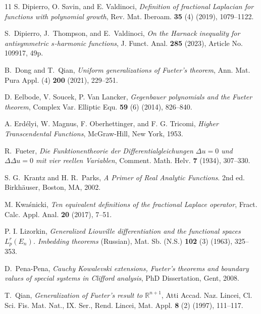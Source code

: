 \documentclass[reqno,11pt]{amsart}
\theoremstyle{definition}
\begin{document}
\begin{thebibliography}{11}
S. Dipierro, O. Savin, and E. Valdinoci,
\textit{Definition of fractional Laplacian for functions with polynomial growth}, Rev. Mat. Iberoam. \textbf{35} (4) (2019), 1079--1122.


S.~Dipierro, J.~Thompson, and E.~Valdinoci,
\textit{On the Harnack inequality for antisymmetric $s$-harmonic functions},
J. Funct. Anal. \textbf{285} (2023), Article No. 109917, 49p.	






B.~Dong and T.~Qian,
\textit{Uniform generalizations of Fueter's theorem},
Ann. Mat. Pura Appl. (4)  \textbf{200} (2021), 229--251.



D. Eelbode, V. Soucek, P. Van Lancker,
\emph{Gegenbauer polynomials and the Fueter theorem},
Complex Var. Elliptic Equ. \textbf{59} (6) (2014), 826--840.

A. Erd{\'e}lyi, W. Magnus, F. Oberhettinger, and F. G. Tricomi,
\newblock \emph{Higher Transcendental Functions},
\newblock McGraw-Hill, New York, 1953.
	


R.~Fueter,
\textit{Die {F}unktionentheorie der {D}ifferentialgleichungen $\Delta u=0$ und $\Delta \Delta u=0$ mit vier reellen {V}ariablen},
Comment. Math. Helv. \textbf{7} (1934), 307--330.





S. G.~Krantz and H. R.~Parks,
\textit{A Primer of Real Analytic Functions}.
2nd ed. Birkh\"auser, Boston, MA, 2002.


M. Kwa{\'s}nicki,
\textit{Ten equivalent definitions of the fractional {Laplace} operator},
Fract. Calc. Appl. Anal. \textbf{20} (2017), 7--51.


P. I. Lizorkin,
\textit{Generalized Liouville differentiation and the functional spaces $L^r_p(E_n)$. Imbedding theorems} (Russian),
Mat. Sb. (N.S.) \textbf{102} (3) (1963), 325--353.

	 D.~Pena-Pena, \emph{Cauchy Kowalevski extensions, Fueter's theorems and boundary values of special systems in Clifford analysis}, PhD Dissertation, Gent, 2008.



T.~Qian,
\textit{Generalization of Fueter's result to $\mathbb{R}^{n+1}$},
Atti Accad. Naz. Lincei, Cl. Sci. Fis. Mat. Nat., IX. Ser., Rend. Lincei, Mat. Appl. \textbf{8} (2) (1997), 111--117.
	

\end{thebibliography}
\end{document}
